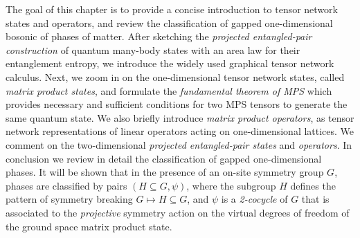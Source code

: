 \bigskip\noindent The goal of this chapter is to provide a concise introduction to tensor network states and operators, and review the classification of gapped one-dimensional bosonic of phases of matter. After sketching the \emph{projected entangled-pair construction} of quantum many-body states with an area law for their entanglement entropy, we introduce the widely used graphical tensor network calculus. Next, we zoom in on the one-dimensional tensor network states, called \emph{matrix product states}, and formulate the \emph{fundamental theorem of MPS} which provides necessary and sufficient conditions for two MPS tensors to generate the same quantum state. We also briefly introduce \emph{matrix product operators}, as tensor network representations of linear operators acting on one-dimensional lattices. We comment on the two-dimensional \emph{projected entangled-pair states} and \emph{operators}. In conclusion we review in detail the classification of gapped one-dimensional phases. It will be shown that in the presence of an on-site symmetry group $G$, phases are classified by pairs $(H\subseteq G,\psi)$, where the subgroup $H$ defines the pattern of symmetry breaking $G\mapsto H\subseteq G$, and $\psi$ is a \emph{2-cocycle} of $G$ that is associated to the \emph{projective} symmetry action on the virtual degrees of freedom of the ground space matrix product state.
